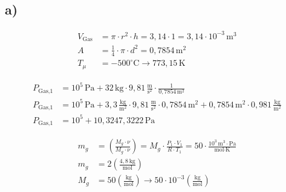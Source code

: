 

\subsection*{a)}

\begin{align*}
V_{\text{Gas}} &= \pi \cdot r^2 \cdot h = 3,14 \cdot 1 = 3,14 \cdot 10^{-3} \, \text{m}^3 \\
A &= \frac{1}{4} \cdot \pi \cdot d^2 = 0,7854 \, \text{m}^2 \\
T_{\mu} &= -500^\circ \text{C} \rightarrow 773,15 \, \text{K}
\end{align*}

\begin{center}
\end{center}

\begin{align*}
P_{\text{Gas,1}} &= 10^5 \, \text{Pa} + 32 \, \text{kg} \cdot 9,81 \, \frac{\text{m}}{\text{s}^2} \cdot \frac{1}{0,7854 \, \text{m}^2} \\
P_{\text{Gas,1}} &= 10^5 \, \text{Pa} + 3,3 \, \frac{\text{kg}}{\text{m}^2} \cdot 9,81 \, \frac{\text{m}}{\text{s}^2} \cdot 0,7854 \, \text{m}^2 + 0,7854 \, \text{m}^2 \cdot 0,981 \, \frac{\text{kg}}{\text{m}^2} \\
P_{\text{Gas,1}} &= 10^5 + 10,3247,3222 \, \text{Pa}
\end{align*}

\begin{align*}
m_g &= \left( \frac{M_g \cdot \nu}{M_g \cdot \nu} \right) = M_g \cdot \frac{P_1 \cdot V_1}{R \cdot T_1} = 50 \cdot \frac{10^3 \, \text{m}^3 \cdot \text{Pa}}{\text{mol} \cdot \text{K}} \\
m_g &= 2 \left( \frac{4,8 \, \text{kg}}{\text{mol}} \right) \\
M_g &= 50 \left( \frac{\text{kg}}{\text{mol}} \right) \rightarrow 50 \cdot 10^{-3} \left( \frac{\text{kg}}{\text{mol}} \right)
\end{align*}